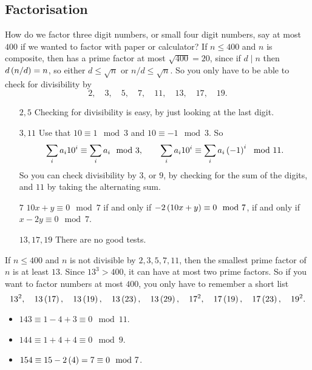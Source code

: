 \subsection{Factorisation}

How do we factor three digit numbers, or small four digit numbers, say at most $ 400 $ if we wanted to factor with paper or calculator? If $ n \le 400 $ and $ n $ is composite, then has a prime factor at most $ \sqrt{400} = 20 $, since if $ d \mid n $ then $ d\left( n / d \right) = n $, so either $ d \le \sqrt{n} $ or $ n / d \le \sqrt{n} $. So you only have to be able to check for divisibility by
$$ 2, \quad 3, \quad 5, \quad 7, \quad 11, \quad 13, \quad 17, \quad 19. $$
\begin{itemize}[leftmargin=0.75in]
\item[$ 2, 5 $] Checking for divisibility is easy, by just looking at the last digit.
\item[$ 3, 11 $] Use that $ 10 \equiv 1 \mod 3 $ and $ 10 \equiv -1 \mod 3 $. So
$$ \sum_i a_i10^i \equiv \sum_i a_i \mod 3, \qquad \sum_i a_i10^i \equiv \sum_i a_i\left( -1 \right)^i \mod 11. $$
So you can check divisibility by $ 3 $, or $ 9 $, by checking for the sum of the digits, and $ 11 $ by taking the alternating sum.
\item[$ 7 $] $ 10x + y \equiv 0 \mod 7 $ if and only if $ -2\left( 10x + y \right) \equiv 0 \mod 7 $, if and only if $ x - 2y \equiv 0 \mod 7 $.
\item[$ 13, 17, 19 $] There are no good tests.
\end{itemize}
If $ n \le 400 $ and $ n $ is not divisible by $ 2, 3, 5, 7, 11 $, then the smallest prime factor of $ n $ is at least $ 13 $. Since $ 13^3 > 400 $, it can have at most two prime factors. So if you want to factor numbers at most $ 400 $, you only have to remember a short list
$$ 13^2, \quad 13\left( 17 \right), \quad 13\left( 19 \right), \quad 13\left( 23 \right), \quad 13\left( 29 \right), \quad 17^2, \quad 17\left( 19 \right), \quad 17\left( 23 \right), \quad 19^2. $$

\begin{example*}
\hfill
\begin{itemize}
\item $ 143 \equiv 1 - 4 + 3 \equiv 0 \mod 11 $.
\item $ 144 \equiv 1 + 4 + 4 \equiv 0 \mod 9 $.
\item $ 154 \equiv 15 - 2\left( 4 \right) = 7 \equiv 0 \mod 7 $.
\end{itemize}
\end{example*}


